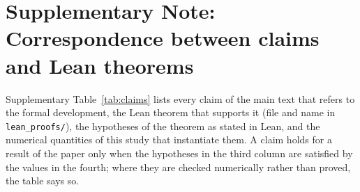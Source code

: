 
\section*{Supplementary Note: Correspondence between claims and Lean theorems}

Supplementary Table~\ref{tab:claims} lists every claim of the main text that refers to the formal development, the Lean theorem that supports it (file and name in \texttt{lean\_proofs/}), the hypotheses of the theorem as stated in Lean, and the numerical quantities of this study that instantiate them. A claim holds for a result of the paper only when the hypotheses in the third column are satisfied by the values in the fourth; where they are checked numerically rather than proved, the table says so.

